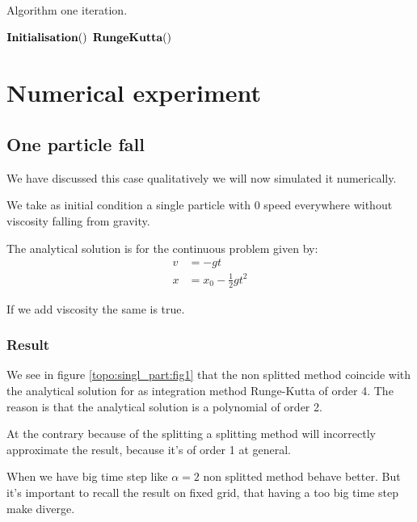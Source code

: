 \begin{algorithm}
\caption{Algorithm one iteration.}
\label{code:RungeKutta3}
\begin{algorithmic}[1]
\State $\mathop{\textbf{Initialisation}}()$
\State $\mathop{\textbf{RungeKutta}}()$
\EndProcedure
        \end{algorithmic}
\end{algorithm}

\FloatBarrier
\section{Numerical experiment}

\subsection{One particle fall}

We have discussed this case qualitatively we will now simulated it numerically.

We take as initial condition a single particle with 0 speed everywhere without viscosity falling from gravity.

The analytical solution is for the continuous problem given by:
\begin{align}
v&=-gt\\
x&=x_0-\frac{1}{2}gt^2
\end{align}

If we add viscosity the same is true.

\subsubsection{Result}

We see in figure \ref{topo:singl_part:fig1} that the non splitted method coincide with the analytical solution for as
integration method Runge-Kutta of order 4. The reason is that the analytical solution is a polynomial of order 2.

At the contrary because of the splitting a splitting method will incorrectly approximate the result, because it's of order 1 at general.

When we have big time step like $\alpha=2$ non splitted method behave better. But it's important to recall the result on fixed grid,
that having a too big time step make diverge.


